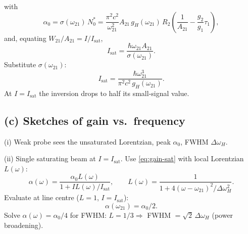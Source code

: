 \documentclass[11pt]{article}
\begin{document}
with
\begin{equation}
\alpha_{0}=\sigma(\omega_{21})\,N_{0}^{*}=\frac{\pi^{2}c^{2}}{\omega_{21}^{2}}A_{21}\,g_{H}(\omega_{21})\,R_{2}\!\left(\frac{1}{A_{21}}-\frac{g_{2}}{g_{1}}\tau_{1}\right),
\label{eq:alpha0}
\end{equation}
and, equating $W_{21}/A_{21}=I/I_{\mathrm{sat}}$,
\begin{equation}
I_{\mathrm{sat}}=\frac{\hbar\omega_{21}A_{21}}{\sigma(\omega_{21})}.
\end{equation}
Substitute $\sigma(\omega_{21})$:
\begin{equation}
\boxed{\;I_{\mathrm{sat}}=\frac{\hbar\omega_{21}^{3}}{\pi^{2}c^{2}\,g_{H}(\omega_{21})}.\;}
\label{eq:Isat}
\end{equation}
At $I=I_{\mathrm{sat}}$ the inversion drops to half its small-signal value.

\subsection*{(c) Sketches of gain vs.\ frequency}

\begin{center}
\end{center}

(i) Weak probe sees the unsaturated Lorentzian, peak $\alpha_{0}$, FWHM $\Delta\omega_{H}$.

(ii) Single saturating beam at $I=I_{\mathrm{sat}}$. Use \eqref{eq:gain-sat} with local Lorentzian $L(\omega)$:
\begin{equation}
\alpha(\omega)=\frac{\alpha_{0}L(\omega)}{1+IL(\omega)/I_{\mathrm{sat}}},\qquad L(\omega)=\frac{1}{1+4(\omega-\omega_{21})^{2}/\Delta\omega_{H}^{2}}.
\end{equation}
Evaluate at line centre ($L=1$, $I=I_{\mathrm{sat}}$):
\begin{equation}
\alpha(\omega_{21})=\alpha_{0}/2.
\end{equation}
Solve $\alpha(\omega)=\alpha_{0}/4$ for FWHM: $L=1/3\Rightarrow$ FWHM $=\sqrt{2}\,\Delta\omega_{H}$ (power broadening).
\end{document}
